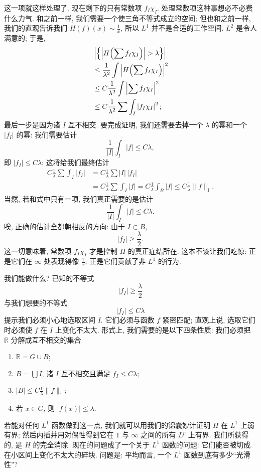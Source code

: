 这一项就这样处理了. 现在剩下的只有常数项 $f_{I}\chi_{I}$. 处理常数项这种事想必不必费什么力气. 和之前一样, 我们需要一个使三角不等式成立的空间; 但也和之前一样, 我们的直观告诉我们 $H(f)(x)\sim\frac{1}{x}$, 所以 $L^{1}$ 并不是合适的工作空间. $L^{2}$ 是令人满意的; 于是,
\begin{align*}
&\left|\left\{\left|H\Bigl(\sum f_{I}\chi_{I}\Bigr)\right|>\lambda\right\}\right| \\
&\leq\frac{1}{\lambda^{2}}\int\left|H\Bigl(\sum f_{I}\chi_{I}\Bigr)\right|^{2} \\
&\leq C\frac{1}{\lambda^{2}}\int\left|\sum f_{I}\chi_{I}\right|^{2} \\
&\leq C\frac{1}{\lambda^{2}}\sum\int_{I}\left|f_{I}\chi_{I}\right|^{2};
\end{align*}
最后一步是因为诸 $I$ 互不相交. 要完成证明, 我们还需要去掉一个 $\lambda$ 的幂和一个 $|f_I|$ 的幂: 我们需要估计
\[
\frac{1}{\left|I\right|}\int_{I}\left|f\right|\leq C\lambda,
\]
即 $|f_{I}|\leq C\lambda$; 这将给我们最终估计
\begin{align*}
C\frac{1}{\lambda}\sum\int_{I}|f_{I}|
&=C\frac{1}{\lambda}\sum|I|\,|f_{I}| \\
&=C\frac{1}{\lambda}\sum\int_{I}|f|
=C\frac{1}{\lambda}\int_{B}|f|\leq C\frac{1}{\lambda}\|f\|_{1}.
\end{align*}
当然, 若和式中只有一项, 我们真正需要的是估计
\[
\frac{1}{\left|I\right|}\int_{I}\left|f\right|\leq C\lambda.
\]
唉, 正确的估计全都朝相反的方向: 由于 $I\subset B$,
\[
|f_{I}|\geq\frac{\lambda}{2}.
\]
这一切意味着, 常数项 $f_{I}\chi_{I}$ 才是控制 $H$ 的真正症结所在. 这本不该让我们吃惊: 正是它们在 $\infty$ 处表现得像 $\frac{1}{x}$; 正是它们贡献了非 $L^{1}$ 的行为.

我们能做什么? 已知的不等式
\[
|f_{I}|\geq\frac{\lambda}{2}
\]
与我们想要的不等式
\[
|f_{I}|\leq C\lambda
\]
提示我们必须小心地选取区间 $I$. 它们必须与函数 $f$ 紧密匹配; 直观上说, 选取它们时必须使 $f$ 在 $I$ 上变化不太大. 形式上, 我们需要的是以下四条性质: 我们必须把 $\mathbb{R}$ 分解成互不相交的集合
\begin{enumerate}[label=\arabic*)]
\item $\mathbb{R}=G\cup B$;
\item $B=\bigcup I$, 诸 $I$ 互不相交且满足 $f_I\leq C\lambda$;
\item $|B|\leq C\frac{1}{\lambda}\|f\|_{1}$;
\item 若 $x\in G$, 则 $|f(x)|\leq\lambda$.
\end{enumerate}

若能对任何 $L^1$ 函数做到这一点, 我们就可以用我们的锦囊妙计证明 $H$ 在 $L^1$ 上弱有界; 然后内插并用对偶性得到它在 $1$ 与 $\infty$ 之间的所有 $L^p$ 上有界. 我们所获得的, 是 $H$ 的完全消除. 现在的问题成了一个关于 $L^1$ 函数的问题: 它们能否被切成在小区间上变化不太大的碎块. 问题是: 平均而言, 一个 $L^1$ 函数到底有多少``光滑性''?

